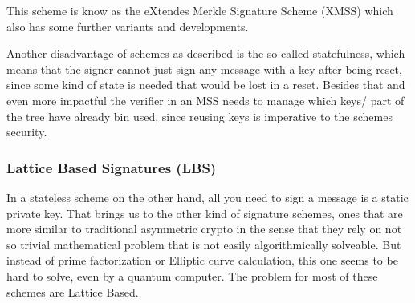 \documentclass[conference]{IEEEtran}
\begin{document}
This scheme is know as the eXtendes Merkle Signature Scheme (XMSS) which also has some further variants and developments. \cite{QR_IoT }

Another disadvantage of schemes as described is the so-called statefulness, which means that the signer cannot just sign any message with a key after being reset, since some kind of state is needed that would be lost in a reset. \cite{QR_sigs} 
Besides that and even more impactful the verifier in an MSS needs to manage which keys/ part of the tree have already bin used, since reusing keys is imperative to the schemes security.

\subsubsection{Lattice Based Signatures (LBS)}
In a stateless scheme on the other hand, all you need to sign a message is a static private key.
That brings us to the other kind of signature schemes, ones that are more similar to traditional asymmetric crypto in the sense that they rely on not so trivial mathematical problem that is not easily algorithmically solveable. But instead of prime factorization or Elliptic curve calculation, this one seems to be hard to solve, even by a quantum computer. The problem for most of these schemes are Lattice Based.
\end{document}
